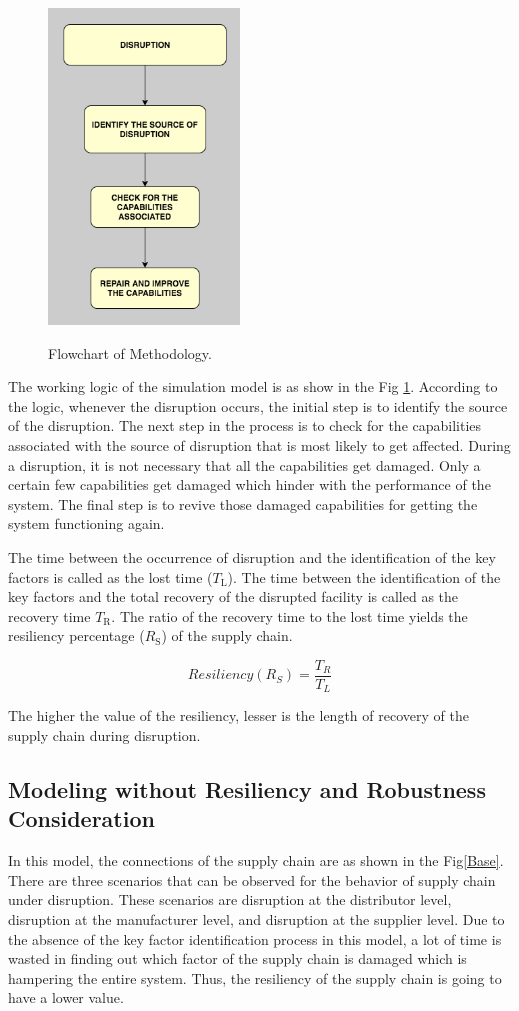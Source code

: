\begin{figure}[H]
  \centering
  \includegraphics[width=2.0in]{figures/pdf/WL.png}\\
  \caption{Flowchart of Methodology.}\label{WL}
\end{figure}

 The working logic of the simulation model is as show in the Fig \ref{WL}. According to the logic, whenever the disruption occurs, the initial step is to identify the source of the disruption. The next step in the process is to check for the capabilities associated with the source of disruption that is most likely to get affected. During a disruption, it is not necessary that all the capabilities get damaged. Only a certain few capabilities get damaged which hinder with the performance of the system. The final step is to revive those damaged capabilities for getting the system functioning again.
 
The time between the occurrence of disruption and the identification of the key factors is called as the lost time ($T_{\text{L}}$). The time between the identification of the key factors and the total recovery of the disrupted facility is called as the recovery time $T_{\text{R}}$. The ratio of the recovery time to the lost time yields the resiliency percentage ($R_{\text{S}}$)  of the supply chain. 
 
 \begin{equation}
    Resiliency(R_S) = \frac{T_R}{T_L} \label{3.1}
\end{equation}

The higher the value of the resiliency, lesser is the length of recovery of the supply chain during disruption.

\subsection{Modeling without Resiliency and Robustness Consideration}
 In this model, the connections of the supply chain are as shown in the Fig\ref{Base}. There are three scenarios that can be observed for the behavior of supply chain under disruption. These scenarios are disruption at the distributor level, disruption at the manufacturer level, and disruption at the supplier level. Due to the absence of the key factor identification process in this model, a lot of time is wasted in finding out which factor of the supply chain is damaged which is hampering the entire system. Thus, the resiliency of the supply chain is going to have a lower value. 

